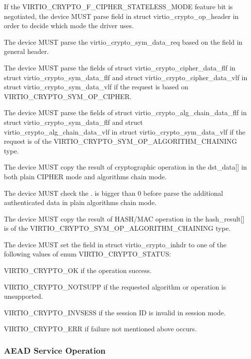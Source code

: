 \begin{itemize*}
\item If the VIRTIO_CRYPTO_F_CIPHER_STATELESS_MODE feature bit is negotiated, the device
    MUST parse  field in struct virtio_crypto_op_header in order to decide
	which mode the driver uses.
\item The device MUST parse the virtio_crypto_sym_data_req based on the 
    field in general header.
\item The device MUST parse the fields of struct virtio_crypto_cipher_data_flf in
    struct virtio_crypto_sym_data_flf and struct virtio_crypto_cipher_data_vlf in
    struct virtio_crypto_sym_data_vlf if the request is based on VIRTIO_CRYPTO_SYM_OP_CIPHER.
\item The device MUST parse the fields of struct virtio_crypto_alg_chain_data_flf
    in struct virtio_crypto_sym_data_flf and struct virtio_crypto_alg_chain_data_vlf
    in struct virtio_crypto_sym_data_vlf if the request is of the VIRTIO_CRYPTO_SYM_OP_ALGORITHM_CHAINING
    type.
\item The device MUST copy the result of cryptographic operation in the dst_data[] in
    both plain CIPHER mode and algorithms chain mode.
\item The device MUST check the . is bigger than 0 before
    parse the additional authenticated data in plain algorithms chain mode.
\item The device MUST copy the result of HASH/MAC operation in the hash_result[] is
    of the VIRTIO_CRYPTO_SYM_OP_ALGORITHM_CHAINING type.
\item The device MUST set the  field in struct virtio_crypto_inhdr to
    one of the following values of enum VIRTIO_CRYPTO_STATUS:
\begin{itemize*}
\item VIRTIO_CRYPTO_OK if the operation success.
\item VIRTIO_CRYPTO_NOTSUPP if the requested algorithm or operation is unsupported.
\item VIRTIO_CRYPTO_INVSESS if the session ID is invalid in session mode.
\item VIRTIO_CRYPTO_ERR if failure not mentioned above occurs.
\end{itemize*}
\end{itemize*}

\subsubsection{AEAD Service Operation}\label{sec:Device Types / Crypto Device / Device Operation / AEAD Service Operation}

